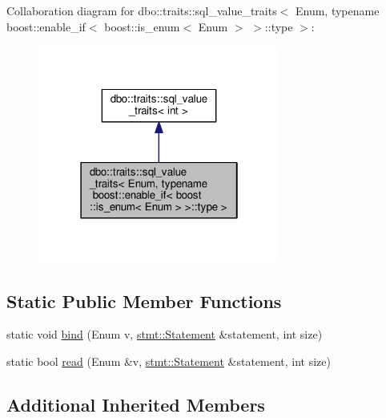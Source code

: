 Collaboration diagram for dbo\+:\+:traits\+:\+:sql\+\_\+value\+\_\+traits$<$ Enum, typename boost\+:\+:enable\+\_\+if$<$ boost\+:\+:is\+\_\+enum$<$ Enum $>$ $>$\+:\+:type $>$\+:\nopagebreak
\begin{figure}[H]
\begin{center}
\leavevmode
\includegraphics[width=226pt]{structdbo_1_1traits_1_1sql__value__traits_3_01_enum_00_01typename_01boost_1_1enable__if_3_01boosb09fed6fc036a161d753d0ad3ec76c32}
\end{center}
\end{figure}
\subsection*{Static Public Member Functions}
\begin{DoxyCompactItemize}
\item 
static void \hyperlink{structdbo_1_1traits_1_1sql__value__traits_3_01_enum_00_01typename_01boost_1_1enable__if_3_01boosf3db7d431a3cc6684d99d55c76c69c74_a36aa66ecb75b33e4e2188a92e7dcb2aa}{bind} (Enum v, \hyperlink{classdbo_1_1stmt_1_1_statement}{stmt\+::\+Statement} \&statement, int size)
\item 
static bool \hyperlink{structdbo_1_1traits_1_1sql__value__traits_3_01_enum_00_01typename_01boost_1_1enable__if_3_01boosf3db7d431a3cc6684d99d55c76c69c74_ad90a9efb8622c9e5bfa3e1336f2c4891}{read} (Enum \&v, \hyperlink{classdbo_1_1stmt_1_1_statement}{stmt\+::\+Statement} \&statement, int size)
\end{DoxyCompactItemize}
\subsection*{Additional Inherited Members}


